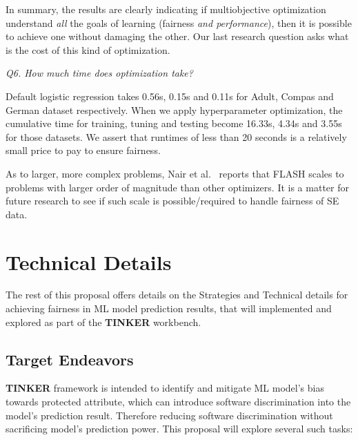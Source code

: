 \documentclass{NSF}
\newcommand{\IT}{{\bf {\sffamily TINKER}}}
\newcommand{\IT}{{\bf {\sffamily TINKER}}}
\begin{document}
\begin{nsfdescription}
 In summary, the results are clearly indicating if  multiobjective  optimization understand {\em all} the goals of learning
 (fairness {\em and performance}), then it is possible to achieve one without
 damaging the other. Our last research question asks  what is the cost of this kind of optimization.

{\em Q6. How much time does optimization take?}

Default logistic regression takes 0.56s, 0.15s and 0.11s for Adult, Compas and German dataset respectively. When we apply hyperparameter optimization, the cumulative time for training, tuning and testing become 16.33s, 4.34s and 3.55s for those datasets. 
We assert that  runtimes of less than 20 seconds is a relatively small price to pay to ensure fairness. 

As to larger, more complex problems, Nair et al.~\cite{8469102} reports
that FLASH scales to problems with larger order of magnitude than other optimizers. It is a matter for future research to see if such scale is possible/required to handle fairness of SE data. 




\section{ Technical Details}\label{tion:details}



The rest of this proposal offers details  on the Strategies and Technical details for achieving fairness in ML model prediction results, that will implemented and explored as part
of the {\IT} workbench. 

\subsection{Target Endeavors}\label{tion:ende}

{\IT} framework is intended to identify and mitigate ML model's bias towards protected attribute, which can introduce software discrimination into the model's prediction result. Therefore reducing software discrimination without sacrificing model's prediction power. This proposal will explore
several  such tasks:



\end{nsfdescription}
\end{document}

